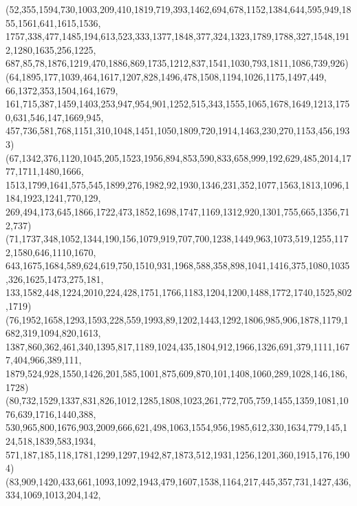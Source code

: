 \documentclass[a4paper,twopage,reqno,12pt]{amsart}
\theoremstyle{definition}
\numberwithin{equation}{section}
\begin{document}
\begin{enumerate}
{{(52,355,1594,730,1003,209,410,1819,719,393,1462,694,678,1152,1384,644,595,949,1855,1561,641,1615,1536,\\
1757,338,477,1485,194,613,523,333,1377,1848,377,324,1323,1789,1788,327,1548,1912,1280,1635,256,1225,\\
687,85,78,1876,1219,470,1886,869,1735,1212,837,1541,1030,793,1811,1086,739,926)\\
(64,1895,177,1039,464,1617,1207,828,1496,478,1508,1194,1026,1175,1497,449, 66,1372,353,1504,164,1679,\\
161,715,387,1459,1403,253,947,954,901,1252,515,343,1555,1065,1678,1649,1213,1750,631,546,147,1669,945,\\
457,736,581,768,1151,310,1048,1451,1050,1809,720,1914,1463,230,270,1153,456,1933)\\
(67,1342,376,1120,1045,205,1523,1956,894,853,590,833,658,999,192,629,485,2014,1777,1711,1480,1666,\\
1513,1799,1641,575,545,1899,276,1982,92,1930,1346,231,352,1077,1563,1813,1096,1184,1923,1241,770,129,\\
269,494,173,645,1866,1722,473,1852,1698,1747,1169,1312,920,1301,755,665,1356,712,737)\\
(71,1737,348,1052,1344,190,156,1079,919,707,700,1238,1449,963,1073,519,1255,1172,1580,646,1110,1670,\\
643,1675,1684,589,624,619,750,1510,931,1968,588,358,898,1041,1416,375,1080,1035,326,1625,1473,275,181,\\
133,1582,448,1224,2010,224,428,1751,1766,1183,1204,1200,1488,1772,1740,1525,802,1719)\\
(76,1952,1658,1293,1593,228,559,1993,89,1202,1443,1292,1806,985,906,1878,1179,1682,319,1094,820,1613,\\
1387,860,362,461,340,1395,817,1189,1024,435,1804,912,1966,1326,691,379,1111,1677,404,966,389,111,\\
1879,524,928,1550,1426,201,585,1001,875,609,870,101,1408,1060,289,1028,146,186,1728)\\
(80,732,1529,1337,831,826,1012,1285,1808,1023,261,772,705,759,1455,1359,1081,1076,639,1716,1440,388,\\
530,965,800,1676,903,2009,666,621,498,1063,1554,956,1985,612,330,1634,779,145,124,518,1839,583,1934,\\
571,187,185,118,1781,1299,1297,1942,87,1873,512,1931,1256,1201,360,1915,176,1904)\\
(83,909,1420,433,661,1093,1092,1943,479,1607,1538,1164,217,445,357,731,1427,436,334,1069,1013,204,142,\\
}}
\end{enumerate}
\end{document}
